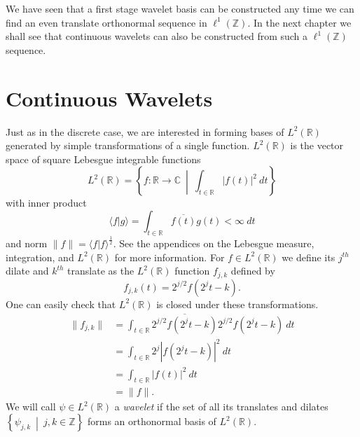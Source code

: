 \documentclass{report}
\newcommand{\Z}{\mathbb{Z}}
\newcommand{\R}{\mathbb{R}}
\newcommand{\C}{\mathbb{C}}
\begin{document}
We have seen that a first stage wavelet basis can be constructed any time we can find an even translate orthonormal sequence in $\ell^1(\Z)$. In the next chapter we shall see that continuous wavelets can also be constructed from such a $\ell^1(\Z)$  sequence.

\chapter{Continuous Wavelets}
\label{ch:cont}

Just as in the discrete case, we are interested in forming bases of $L^2 (\R)$ generated by simple transformations of a single function. 
$L^2(\R)$ is the vector space of square Lebesgue integrable functions
$$L^2(\R)=\left \{ f:\R \to \C  \ \middle | \ \int_{t\in \R} |f(t)|^2 \ dt \right \}$$
with inner product
$$\langle f | g \rangle = \int_{t \in \R} \overline{f(t)}g(t)< \infty\ dt$$
and norm $\|f\|=\langle f | f \rangle ^\frac{1}{2}$. See the appendices on the Lebesgue measure, integration, and $L^2(\R)$ for more information.
For $f\in L^2 (\R)$ we define its $j^{th}$ dilate and $k^{th}$ translate as the $L^2 (\R)$ function $f_{j,k}$ defined by
$$
f_{j,k}(t)=2^{j/2}f(2^jt-k).
$$
One can easily check that $L^2 (\R)$ is closed under these transformations.
\begin{align*}
\| f_{j,k} \|& = \int_{t \in \R} \overline {2^{j/2} f(2^jt-k)}2^{j/2} f(2^jt-k) \ dt\\
& = \int_{t \in \R} {2^j} |f(2^jt-k)|^2 \ dt\\
& = \int_{t \in \R} |f(t)|^2 \ dt\\
& = \|f\| .
\end{align*}
We will call $\psi \in L^2 (\R)$ a \emph{wavelet} if the set of all its translates and dilates $\left \{ \psi_{j,k} \ \middle | \ j,k \in \Z \right \}$ forms an orthonormal basis of $L^2 (\R)$.
\end{document}
